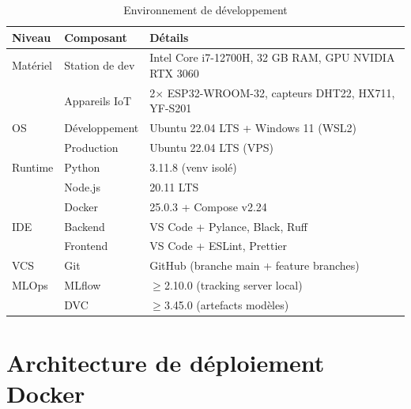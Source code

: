 \begin{table}[H]
\centering
\caption{Environnement de développement}
\label{tab:env_dev}
\begin{tabularx}{\linewidth}{llX}
\toprule
\textbf{Niveau} & \textbf{Composant} & \textbf{Détails} \\
\midrule
Matériel & Station de dev & Intel Core i7-12700H, 32 GB RAM, GPU NVIDIA RTX 3060 \\
         & Appareils IoT  & 2$\times$ ESP32-WROOM-32, capteurs DHT22, HX711, YF-S201 \\
OS       & Développement  & Ubuntu 22.04 LTS + Windows 11 (WSL2) \\
         & Production     & Ubuntu 22.04 LTS (VPS) \\
Runtime  & Python         & 3.11.8 (venv isolé) \\
         & Node.js        & 20.11 LTS \\
         & Docker         & 25.0.3 + Compose v2.24 \\
IDE      & Backend        & VS Code + Pylance, Black, Ruff \\
         & Frontend       & VS Code + ESLint, Prettier \\
VCS      & Git            & GitHub (branche main + feature branches) \\
MLOps    & MLflow         & $\geq$2.10.0 (tracking server local) \\
         & DVC            & $\geq$3.45.0 (artefacts modèles) \\
\bottomrule
\end{tabularx}
\end{table}

\section{Architecture de déploiement Docker}

